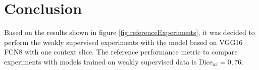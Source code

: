 \section{Conclusion}
\par{
    Based on the results shown in figure \ref{fig:referenceExperiments}, it was decided to perform the weakly supervised experiments with the model based on VGG16 FCN8 with one context slice.
    The reference performance metric to compare experiments with models trained on weakly supervised data is $\text{Dice}_{wi}=0,76$.
}


